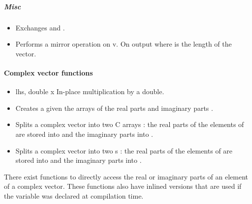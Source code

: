\subparagraph{Misc}

\begin{itemize}
\item {}
  \sshortdescribe Exchanges  and .
\item {}
  \sshortdescribe Performs a mirror operation on v. On output  where  is the length of the vector.
\end{itemize}


\paragraph{Complex vector functions}

\begin{itemize}
\item {}
  { \ptr lhs, double x}
  \sshortdescribe In-place multiplication by a double.

\item {}
  \sshortdescribe Creates a  given the arrays of the
  real parts  and imaginary parts .
\item {}
    \sshortdescribe Splits a complex vector into two C arrays : the
    real parts of the elements of  are stored into  and the
    imaginary parts into .
\item {}
  \sshortdescribe Splits a complex vector into two s : the
  real parts of the elements of  are stored into  and the
imaginary parts into .
\end{itemize}

There exist functions to directly access the real or imaginary parts of an
element of a complex vector. These functions also have inlined versions that
are used if the variable  was declared at compilation time.

